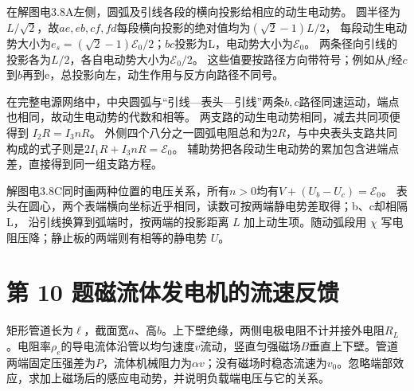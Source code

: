 \documentclass[UTF8,fontset=fandol,a4paper,11pt]{ctexart}
\newcommand{\figcaption}[1]{\par\vspace{2pt}{\small\color{muted}#1}\par}
\begin{document}
在解图电3.8A左侧，圆弧及引线各段的横向投影给相应的动生电动势。
圆半径为$L/\sqrt2$，故$ae,eb,cf,fd$每段横向投影的绝对值均为$(\sqrt2-1)L/2$，
每段动生电动势大小为$e_s=(\sqrt2-1)\mathcal E_0/2$；$bc$投影为L，电动势大小为$\mathcal E_0$。
两条径向引线的投影各为$L/2$，各自电动势大小为$\mathcal E_0/2$。
这些值要按路径方向带符号；例如从$f$经$c$到$b$再到e，总投影向左，动生作用与反方向路径不同号。

在完整电源网络中，中央圆弧与“引线—表头—引线”两条$b,c$路径同速运动，端点也相同，故动生电动势的代数和相等。
两支路的动生电动势相同，减去共同项便得到 $I_2R=I_3nR$。
外侧四个八分之一圆弧电阻总和为$2R$，与中央表头支路共同构成的式子则是$2I_1R+I_3nR=\mathcal E_0$。
辅助势把各段动生电动势的累加包含进端点差，直接得到同一组支路方程。

解图电3.8C同时画两种位置的电压关系，所有$n>0$均有$V+(U_b-U_c)=\mathcal E_0$。
表头在圆心，两个表端横向坐标近乎相同，读数可按两端静电势差取得；b、c却相隔L，
沿引线换算到弧端时，按两端的投影距离 $L$ 加上动生项。随动弧段用 $\chi$ 写电阻压降；静止板的两端则有相等的静电势 $U$。




\section*{第 10 题\quad 磁流体发电机的流速反馈}\label{q:10}

矩形管道长为$\ell$，截面宽$a$、高$b$。上下壁绝缘，两侧电极电阻不计并接外电阻$R_L$。电阻率$\rho_e$的导电流体沿管以均匀速度$v$流动，竖直匀强磁场$B$垂直上下壁。管道两端固定压强差为$P$，流体机械阻力为$\alpha v$；没有磁场时稳态流速为$v_0$。忽略端部效应，求加上磁场后的感应电动势，并说明负载端电压与它的关系。

\begin{center}\begin{minipage}{.98\linewidth}\centering
{}\figcaption{图电3.10\quad 流向沿管长，电流横穿宽$a$，电极接外负载。}\end{minipage}\end{center}
\end{document}
